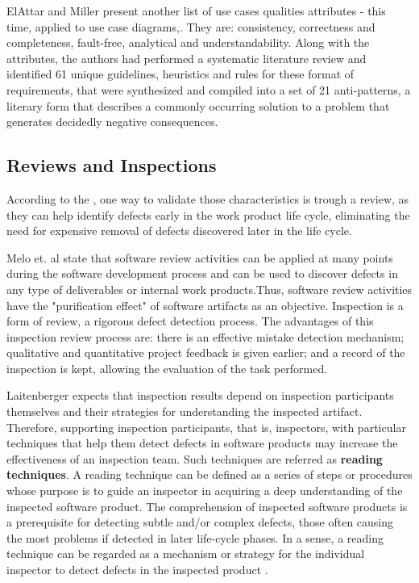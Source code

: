 ElAttar and Miller \cite{Attar_2012} present another list of use cases qualities attributes - this time, applied to use case diagrams,. They are: consistency, correctness and completeness, fault-free, analytical and understandability. Along with the attributes, the authors had performed a systematic literature review and identified 61 unique guidelines, heuristics and rules for these format of requirements, that were synthesized and compiled into a set of 21 anti-patterns, a literary form that describes a commonly occurring solution to a problem that generates decidedly negative consequences.

\subsection{Reviews and Inspections}

According to the \cite{Babok_2015}, one way to validate those characteristics is trough a review, as they can help identify defects early in the work product life cycle, eliminating the need for expensive removal of defects discovered later in the life cycle. 

Melo et. al \cite{Melo_2001} state that software review activities can be applied at many points during the software development process and can be used to discover defects in any type of deliverables or internal work products.Thus, software review activities have the "purification effect" of software artifacts as an objective. Inspection is a form of review, a rigorous defect detection process. The advantages of this inspection review process are: there is an effective mistake detection mechanism; qualitative and quantitative project feedback is given earlier; and a record of the inspection is kept, allowing the evaluation of the task performed. 

Laitenberger \cite{Laitenberger_2002} expects that inspection results depend on inspection participants themselves and their strategies for understanding the inspected artifact. Therefore, supporting inspection participants, that is, inspectors, with particular techniques that help them detect defects in software products may increase the effectiveness of an inspection team. Such techniques are referred as \textbf{reading techniques}. A reading technique can be defined as a series of steps or procedures whose purpose is to guide an inspector in acquiring a deep understanding of the inspected software product. The comprehension of inspected software products is a prerequisite for detecting subtle and/or complex defects, those often causing the most problems if detected in later life-cycle phases. In a sense, a reading technique can be regarded as a mechanism or strategy for the individual inspector to detect defects in the inspected product \cite{Laitenberger_2002}.

